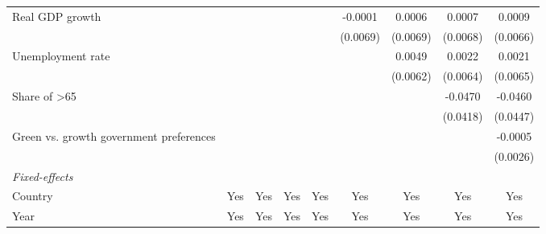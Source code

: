 \begin{table}[htbp]
\begin{tabular}{lcccccccc}
      Real GDP growth                                                                 &          &          &                 &                 & -0.0001         & 0.0006          & 0.0007          & 0.0009\\   
                                                                                      &          &          &                 &                 & (0.0069)        & (0.0069)        & (0.0068)        & (0.0066)\\   
      Unemployment rate                                                               &          &          &                 &                 &                 & 0.0049          & 0.0022          & 0.0021\\   
                                                                                      &          &          &                 &                 &                 & (0.0062)        & (0.0064)        & (0.0065)\\   
      Share of >65                                                                    &          &          &                 &                 &                 &                 & -0.0470         & -0.0460\\   
                                                                                      &          &          &                 &                 &                 &                 & (0.0418)        & (0.0447)\\   
      Green vs. growth government preferences                                         &          &          &                 &                 &                 &                 &                 & -0.0005\\   
                                                                                      &          &          &                 &                 &                 &                 &                 & (0.0026)\\   
      \midrule
      \emph{Fixed-effects}\\
      Country                                                                         & Yes      & Yes      & Yes             & Yes             & Yes             & Yes             & Yes             & Yes\\  
      Year                                                                            & Yes      & Yes      & Yes             & Yes             & Yes             & Yes             & Yes             & Yes\\  

\end{tabular}
\end{table}
